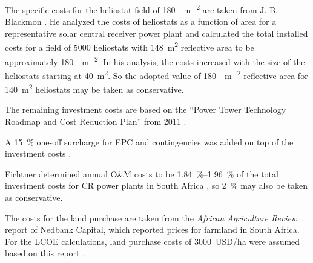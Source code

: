 The specific costs for the heliostat field of \SI{180}{\usd\per\square\metre} are taken from J. B. Blackmon \cite{Blackmon2012}. He analyzed the costs of heliostats as a function of area for a representative solar central receiver power plant and calculated the total installed costs for a field of \num{5000} heliostats with \SI{148}{\square\metre} reflective area to be approximately \SI{180}{\usd\per\square\metre}. In his analysis, the costs increased with the size of the heliostats starting at \SI{40}{\square\metre}. So the adopted value of \SI{180}{\usd\per\square\metre} reflective area for \SI{140}{\square\metre} heliostats may be taken as conservative.

The remaining investment costs are based on the \enquote{Power Tower Technology Roadmap and Cost Reduction Plan} from 2011 \cite{Kolb2011}.

A \SI{15}{\percent} one-off surcharge for \ac{EPC} and contingencies was added on top of the investment costs \cite{Platzer2014}.

Fichtner determined annual \ac{O&M} costs to be \SIrange{1.84}{1.96}{\percent} of the total investment costs for \ac{CR} power plants in South Africa \cite{Fichtner2010}, so \SI{2}{\percent} may also be taken as conservative.

The costs for the land purchase are taken from the \emph{African Agriculture Review} report of Nedbank Capital, which reported prices for farmland in South Africa. For the \ac{LCOE} calculations, land purchase costs of \SI{3000}{USD/\hectare} were assumed based on this report \cite{Cassell2012}.


